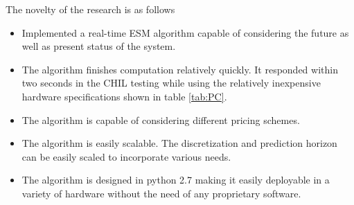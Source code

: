 The novelty of the research is as follows
\begin{itemize}
    \item Implemented a real-time ESM algorithm capable of considering the future as well as present status of the system.
    \item The algorithm finishes computation relatively quickly. It responded within two seconds in the CHIL testing while using the relatively inexpensive hardware specifications shown in table \ref{tab:PC}.
    \item The algorithm is capable of considering different pricing schemes.
    \item The algorithm is easily scalable. The discretization and prediction horizon can be easily scaled to incorporate various needs.
    \item The algorithm is designed in python 2.7 making it easily deployable in a variety of hardware without the need of any proprietary software.
\end{itemize}